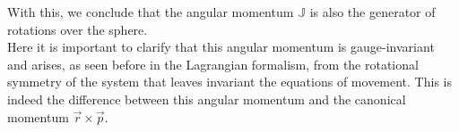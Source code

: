 With this, we conclude that the angular momentum $\mathbb{J}$ is also the generator of rotations over the sphere.\\

Here it is important to clarify that this angular momentum is gauge-invariant and arises, as seen before in the Lagrangian formalism, from the rotational symmetry of the system that leaves invariant the equations of movement. This is indeed the difference between this angular momentum and the canonical momentum $\vec{r}\times\vec{p}$.









